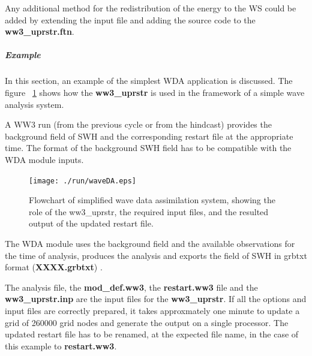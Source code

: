 Any additional method for the redistribution of the energy to the WS could be added 
by extending the input file and adding the source code to the \textbf{ww3\_uprstr.ftn}.

\subparagraph{Example \newline}
In this section, an example of the simplest WDA application is discussed.
The figure ~\ref{fig:waveDAflowchart} shows how the \textbf{ww3\_uprstr} 
is used in the framework of a simple wave analysis system. \newline

A WW3 run (from the previous cycle or from the hindcast) provides the
background field of SWH and the corresponding restart file at the appropriate time. 
The format of the background SWH field has to be compatible with the WDA module inputs.

\begin{figure} \begin{center}
\texttt{[image: ./run/waveDA.eps]}
\caption{Flowchart of simplified wave data assimilation system, 
showing the role of the {ww3\_uprstr}, the required input files,
and the resulted output of the updated restart file.}
\label{fig:waveDAflowchart} \botline
\end{center}
\end{figure}

The WDA module uses the background field and the available observations
for the time of analysis, produces the analysis and exports 
the field of SWH in grbtxt format (\textbf{XXXX.grbtxt}) .

The analysis file, the \textbf{mod\_def.ww3}, the \textbf{restart.ww3} file and 
the \textbf{ww3\_uprstr.inp} are the input files for the \textbf{ww3\_uprstr}. 
If all the options and input files are correctly prepared, it takes approxmately 
one minute to update a grid of 260000 grid nodes and generate the output on a single processor. 
The updated restart file has to be renamed, at the expected file name, in the case of this
example to \textbf{restart.ww3}. \newline  



\pb
